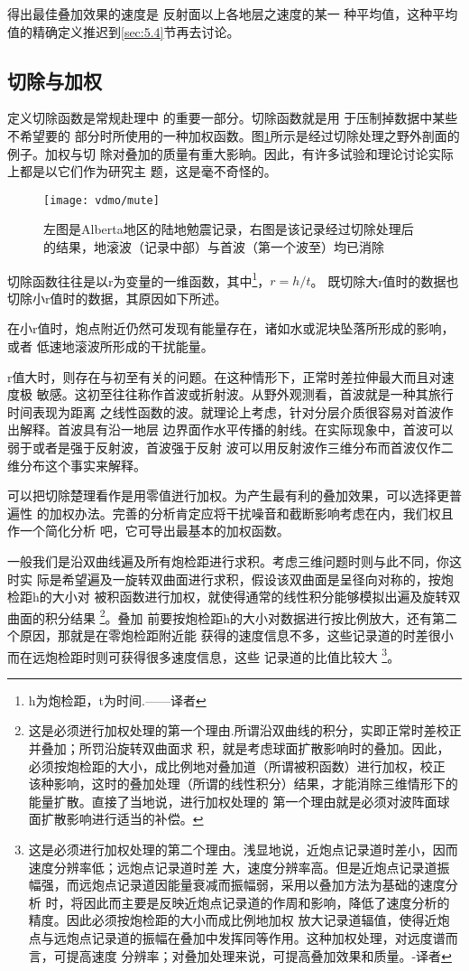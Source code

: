 得出最佳叠加效果的速度是 反射面以上各地层之速度的某一
种平均值，这种平均值的精确定义推迟到\ref{sec:5.4}节再去讨论。

\subsection{切除与加权}
\label{sec:3.5.3}

定义切除函数是常规赴理中
的重要一部分。切除函数就是用 于压制掉数据中某些不希望要的
部分时所使用的一种加权函数。图\ref{fig:vdmo/mute}所示是经过切除处理之野外剖面的例子。加权与切
除对叠加的质量有重大影晌。因此，有许多试验和理论讨论实际上都是以它们作为研究主
题，这是毫不奇怪的。

\begin{figure}[H]
\centering
\texttt{[image: vdmo/mute]}
\caption[mute]{左图是Alberta地区的陆地勉震记录，右图是该记录经过切除处理后
的结果，地滚波（记录中部）与首波（第一个波至）均已消除}
\label{fig:vdmo/mute}
\end{figure}

切除函数往往是以r为变量的一维函数，其中\footnote{h为炮检距，t为时间.------译者}，$r=h/t$。 既切除大r值时的数据也切除小r值时的数据，其原因如下所述。

在小r值时，炮点附近仍然可发现有能量存在，诸如水或泥块坠落所形成的影响，或者
低速地滚波所形成的干扰能量。

r值大时，则存在与初至有关的问题。在这种情形下，正常时差拉伸最大而且对速度极
敏感。这初至往往称作首波或折射波。从野外观测看，首波就是一种其旅行时间表现为距离
之线性函数的波。就理论上考虑，针对分层介质很容易对首波作出解释。首波具有沿一地层
边界面作水平传播的射线。在实际现象中，首波可以弱于或者是强于反射波，首波强于反射
波可以用反射波作三维分布而首波仅作二维分布这个事实来解释。

可以把切除楚理看作是用零值迸行加权。为产生最有利的叠加效果，可以选择更普遍性
的加权办法。完善的分析肯定应将干扰噪音和截断影响考虑在内，我们权且作一个简化分析
吧，它可导出最基本的加权函数。

一般我们是沿双曲线遍及所有炮检距进行求积。考虑三维问题时则与此不同，你这时实
际是希望遍及一旋转双曲面进行求积，假设该双曲面是呈径向对称的，按炮检距h的大小对
被积函数进行加权，就使得通常的线性积分能够模拟出遍及旋转双曲面的积分结果
\footnote{这是必须迸行加权处理的第一个理由.所谓沿双曲线的积分，实即正常时差校正并叠加；所罚沿旋转双曲面求
积，就是考虑球面扩散影响时的叠加。因此，必须按炮检距的大小，成比例地对叠加道（所谓被积函数）进行加权，校正
该种影响，这时的叠加处理（所谓的线性积分）结果，才能消除三维情形下的能量扩散。直接了当地说，进行加权处理的
第一个理由就是必须对波阵面球面扩散影响进行适当的补偿。}。叠加
前要按炮检距h的大小对数据进行按比例放大，还有第二个原因，那就是在零炮检距附近能
获得的速度信息不多，这些记录道的时差很小而在远炮检距时则可获得很多速度信息，这些
记录道的比值比较大
\footnote{这是必须进行加权处理的第二个理由。浅显地说，近炮点记录道时差小，因而速度分辨率低；远炮点记录道时差
大，速度分辨率高。但是近炮点记录道振幅强，而远炮点记录道因能量衰减而振幅弱，采用以叠加方法为基础的速度分析
时，将因此而主要是反映近炮点记录道的作周和影响，降低了速度分析的精度。因此必须按炮检距的大小而成比例地加权
放大记录道辐值，使得近炮点与远炮点记录道的振幅在叠加中发挥同等作用。这种加权处理，对远度谱而言，可提高速度
分辨率；对叠加处理来说，可提高叠加效果和质量。-译者}。

